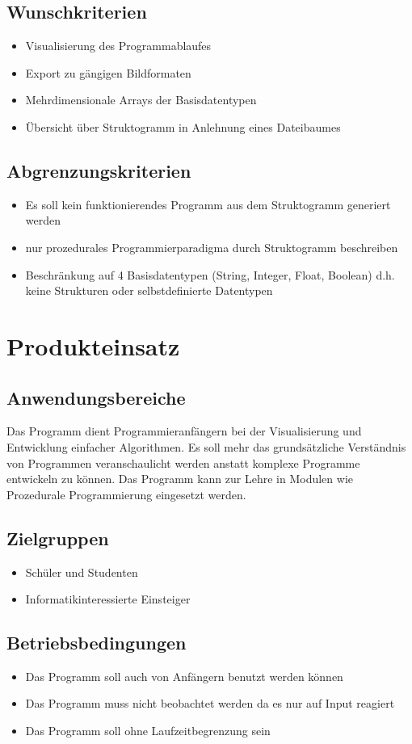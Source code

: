 \documentclass[a4paper,10pt]{report}
\begin{document}
\subsection{Wunschkriterien}
\begin{itemize}
\item Visualisierung des Programmablaufes
\item Export zu gängigen Bildformaten
\item Mehrdimensionale Arrays der Basisdatentypen
\item Übersicht über Struktogramm in Anlehnung eines Dateibaumes
\end{itemize}

\subsection{Abgrenzungskriterien}
\begin{itemize}
\item Es soll kein funktionierendes Programm aus dem Struktogramm generiert werden
\item nur prozedurales Programmierparadigma durch Struktogramm beschreiben
\item Beschränkung auf 4 Basisdatentypen (String, Integer, Float, Boolean) d.h. keine Strukturen oder selbstdefinierte Datentypen
\end{itemize}
\newpage
\section{Produkteinsatz}
\subsection{Anwendungsbereiche}
Das Programm dient Programmieranfängern bei der Visualisierung und Entwicklung einfacher Algorithmen. Es soll mehr das grundsätzliche Verständnis von Programmen
veranschaulicht werden anstatt komplexe Programme entwickeln zu können. Das Programm kann zur Lehre in Modulen wie Prozedurale Programmierung eingesetzt werden.
\subsection{Zielgruppen}
\begin{itemize}
\item Schüler und Studenten
\item Informatikinteressierte Einsteiger
\end{itemize}
\subsection{Betriebsbedingungen}
\begin{itemize}
\item Das Programm soll auch von Anfängern benutzt werden können
\item Das Programm muss nicht beobachtet werden da es nur auf Input reagiert
\item Das Programm soll ohne Laufzeitbegrenzung sein
\end{itemize}
\end{document}
